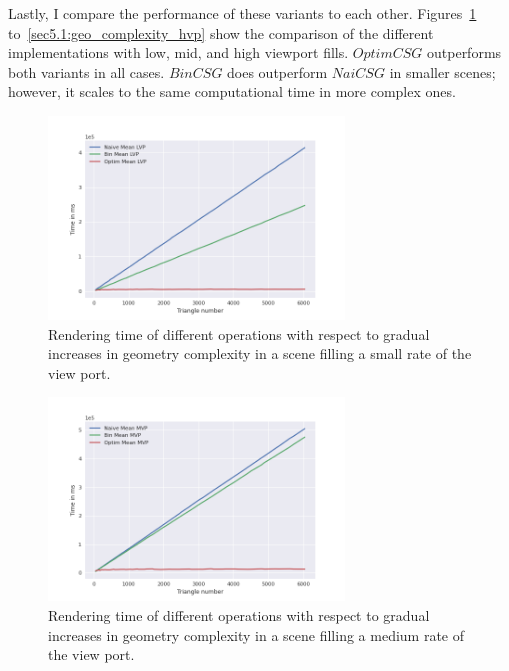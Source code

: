 \documentclass[a4paper,11pt,oneside]{article}
\begin{document}
Lastly, I compare the performance of these variants to each other. Figures~\ref{sec5.1:geo_complexity_lvp} to~\ref{sec5.1:geo_complexity_hvp} show the comparison of the different implementations with low, mid, and high viewport fills. $OptimCSG$ outperforms both variants in all cases. $BinCSG$ does outperform $NaiCSG$ in smaller scenes; however, it scales to the same computational time in more complex ones.

\begin{figure}[H]
	\centering
	\includegraphics[width=0.7\textwidth]{section5/plots/geo_complexity_lvp.png}
	\caption{Rendering time of different operations with respect to gradual increases in geometry complexity in a scene filling a small rate of the view port.}
	\label{sec5.1:geo_complexity_lvp}
\end{figure}

\begin{figure}[H]
	\centering
	\includegraphics[width=0.7\textwidth]{section5/plots/geo_complexity_mvp.png}
	\caption{Rendering time of different operations with respect to gradual increases in geometry complexity in a scene filling a medium rate of the view port.}
	\label{sec5.1:geo_complexity_mvp}
\end{figure}
\end{document}
